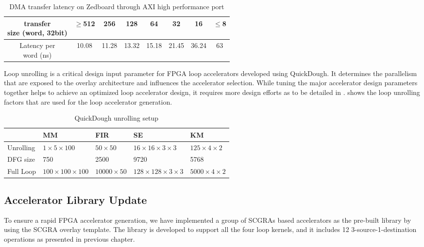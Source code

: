\begin{table}
\footnotesize
    \centering
    \caption{DMA transfer latency on Zedboard through AXI high performance port \label{tab:latency}}{
        \centering
            \begin{tabular}{c|c|c|c|c|c|c|c}
                \hline
                \tabincell{c}{transfer \\ size (word, 32bit)} & $\geq$512 & 256 & 128 & 64 & 32
                                                                  & 16 & $\leq$8  \\ \hline
                \tabincell{c}{Latency per \\ word (ns)}  & 10.08 & 11.28 & 13.32 & 15.18 & 21.45 & 36.24 & 63 \\ \hline
            \end{tabular}
        }
\end{table}

Loop unrolling is a critical design input parameter for FPGA loop accelerators developed using QuickDough. It determines the parallelism that are exposed to the overlay architecture and influences the accelerator selection. While tuning the major accelerator design parameters together helps to achieve an optimized loop accelerator design, it requires more design efforts as to be detailed in .  shows the loop unrolling factors that are used for the loop accelerator generation.

\begin{table}
\footnotesize
\centering
\caption{QuickDough unrolling setup \label{tab:unrolling-setup}}{
        \begin{tabular}{l|l|l|l|l}
            \hline
           & MM & FIR & SE & KM \\ \hline
            Unrolling & $1 \times 5 \times 100$ & $50 \times 50$ & $16 \times 16 \times 3 \times 3$ &
            $125\times 4 \times 2$ \\ \hline
            DFG size & 750 & 2500 & 9720 & 5768 \\ \hline
            Full Loop & $100 \times 100 \times 100$ &  $10000 \times 50$ & $128 \times 128 \times 3
            \times 3$ & $5000 \times 4 \times 2$ \\ \hline
        \end{tabular}
}
\end{table}

\subsection{Accelerator Library Update} \label{subsec:lib-update}
To ensure a rapid FPGA accelerator generation, we have implemented a group of 
SCGRAs based accelerators as the pre-built library by using the SCGRA overlay template. 
The library is developed to support all the four loop kernels, and it includes 12 
3-source-1-destination operations as presented in previous chapter. 

